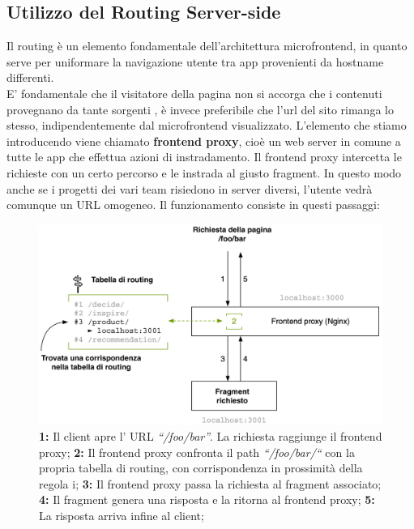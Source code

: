 \subsection{Utilizzo del Routing Server-side}
Il routing è un elemento fondamentale dell’architettura microfrontend, in quanto serve per uniformare la navigazione utente tra app provenienti da hostname differenti. 
\\E' fondamentale che il visitatore della pagina non si accorga che i contenuti provegnano da tante sorgenti
, è invece preferibile che l'url del sito rimanga lo stesso, indipendentemente dal microfrontend visualizzato.
L’elemento che stiamo introducendo viene chiamato \textbf{frontend proxy}, cioè un web server in comune a tutte le app che effettua azioni di instradamento.
 Il frontend proxy intercetta le richieste con un certo percorso e le instrada al giusto fragment. In questo modo anche se
  i progetti dei vari team risiedono in server diversi, l’utente vedrà comunque un URL omogeneo.
Il funzionamento consiste in questi passaggi:

\begin{figure}[H]
    \centering
    \includegraphics[width=128mm]{img/frontend proxy}
    \caption{  
        \textbf{1:} Il client apre l’ URL \emph{“/foo/bar”}. La richiesta raggiunge il frontend proxy;
        \textbf{2:} Il frontend proxy confronta il path \emph{“/foo/bar/“} con la propria tabella di routing, con corrispondenza in prossimità della regola i;
        \textbf{3:} Il frontend proxy passa la richiesta al fragment associato;
        \textbf{4:} Il fragment genera una risposta e la ritorna al frontend proxy;
        \textbf{5:} La risposta arriva infine al client;
   }
  \end{figure}


\pagebreak

